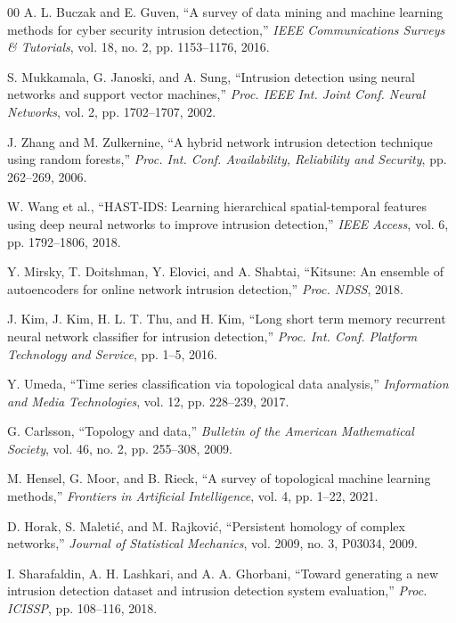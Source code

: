 \documentclass[conference]{IEEEtran}
\begin{document}
\begin{thebibliography}{00}
 A. L. Buczak and E. Guven, ``A survey of data mining and machine learning methods for cyber security intrusion detection,'' \textit{IEEE Communications Surveys \& Tutorials}, vol. 18, no. 2, pp. 1153--1176, 2016.

 S. Mukkamala, G. Janoski, and A. Sung, ``Intrusion detection using neural networks and support vector machines,'' \textit{Proc. IEEE Int. Joint Conf. Neural Networks}, vol. 2, pp. 1702--1707, 2002.

 J. Zhang and M. Zulkernine, ``A hybrid network intrusion detection technique using random forests,'' \textit{Proc. Int. Conf. Availability, Reliability and Security}, pp. 262--269, 2006.

 W. Wang et al., ``HAST-IDS: Learning hierarchical spatial-temporal features using deep neural networks to improve intrusion detection,'' \textit{IEEE Access}, vol. 6, pp. 1792--1806, 2018.

 Y. Mirsky, T. Doitshman, Y. Elovici, and A. Shabtai, ``Kitsune: An ensemble of autoencoders for online network intrusion detection,'' \textit{Proc. NDSS}, 2018.

 J. Kim, J. Kim, H. L. T. Thu, and H. Kim, ``Long short term memory recurrent neural network classifier for intrusion detection,'' \textit{Proc. Int. Conf. Platform Technology and Service}, pp. 1--5, 2016.

 Y. Umeda, ``Time series classification via topological data analysis,'' \textit{Information and Media Technologies}, vol. 12, pp. 228--239, 2017.

 G. Carlsson, ``Topology and data,'' \textit{Bulletin of the American Mathematical Society}, vol. 46, no. 2, pp. 255--308, 2009.

 M. Hensel, G. Moor, and B. Rieck, ``A survey of topological machine learning methods,'' \textit{Frontiers in Artificial Intelligence}, vol. 4, pp. 1--22, 2021.

 D. Horak, S. Maleti\'{c}, and M. Rajkovi\'{c}, ``Persistent homology of complex networks,'' \textit{Journal of Statistical Mechanics}, vol. 2009, no. 3, P03034, 2009.

 I. Sharafaldin, A. H. Lashkari, and A. A. Ghorbani, ``Toward generating a new intrusion detection dataset and intrusion detection system evaluation,'' \textit{Proc. ICISSP}, pp. 108--116, 2018.


\end{thebibliography}
\end{document}
